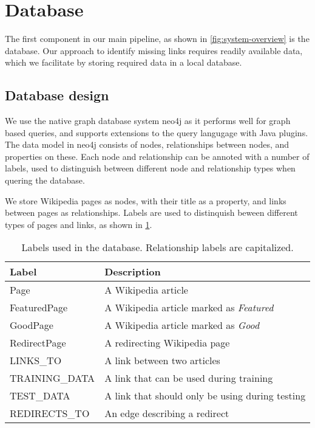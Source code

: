 \section{Database} \label{sec:db}
The first component in our main pipeline, as shown in \cref{fig:system-overview} is the database. Our approach to identify missing links requires readily available data, which we facilitate by storing required data in a local database.

\subsection{Database design} \label{sec:db_design}
We use the native graph database system neo4j as it performs well for graph based queries, and supports extensions to the query langugage with Java plugins. The data model in neo4j consists of nodes, relationships between nodes, and properties on these. Each node and relationship can be annoted with a number of labels, used to distinguish between different node and relationship types when quering the database.

We store Wikipedia pages as nodes, with their title as a property, and links between pages as relationships. Labels are used to distinquish beween different types of pages and links, as shown in \cref{tab:db_labels}.

\begin{table}[tbp]
\centering
\begin{tabular}{@{}ll@{}}
\toprule
\textbf{Label}         & \textbf{Description}                            \\ \midrule
Page                   & A Wikipedia article                             \\
FeaturedPage           & A Wikipedia article marked as \emph{Featured}   \\
GoodPage               & A Wikipedia article marked as \emph{Good}       \\
RedirectPage           & A redirecting Wikipedia page                    \\ \midrule
LINKS\_TO              & A link between two articles                     \\
TRAINING\_DATA         & A link that can be used during training         \\
TEST\_DATA             & A link that should only be using during testing \\
REDIRECTS\_TO          & An edge describing a redirect                   \\ \bottomrule
\end{tabular}
\caption{Labels used in the database. Relationship labels are capitalized.}
\label{tab:db_labels}
\end{table}


